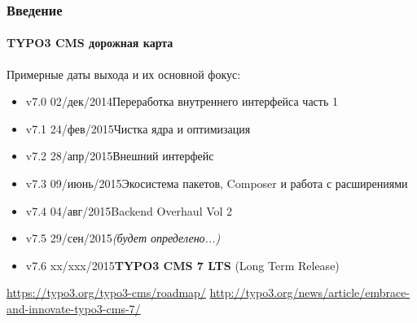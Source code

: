 \begin{frame}[fragile]
	\frametitle{Введение}
	\framesubtitle{TYPO3 CMS дорожная карта}

	Примерные даты выхода и их основной фокус:

	\begin{itemize}
		\item v7.0 \tabto{1.0cm}02/дек/2014\tabto{3.4cm}Переработка внутреннего интерфейса часть 1
		\item v7.1 \tabto{1.0cm}24/фев/2015\tabto{3.4cm}Чистка ядра и оптимизация

		\item
			\begingroup
				\color{typo3orange}
					v7.2 \tabto{1.0cm}28/апр/2015\tabto{3.4cm}Внешний интерфейс
			\endgroup

		\item v7.3 \tabto{1.0cm}09/июнь/2015\tabto{3.4cm}Экосистема пакетов, Composer\newline
			\tabto{3.4cm}и работа с расширениями
		\item v7.4 \tabto{1.0cm}04/авг/2015\tabto{3.4cm}Backend Overhaul Vol 2
		\item v7.5 \tabto{1.0cm}29/сен/2015\tabto{3.4cm}\textit{(будет определено...)}
		\item v7.6 \tabto{1.0cm}xx/xxx/2015\tabto{3.4cm}\textbf{TYPO3 CMS 7 LTS} (Long Term Release)
	\end{itemize}

	\smaller
		\url{https://typo3.org/typo3-cms/roadmap/}\newline
		\url{http://typo3.org/news/article/embrace-and-innovate-typo3-cms-7/}
	\normalsize

\end{frame}


